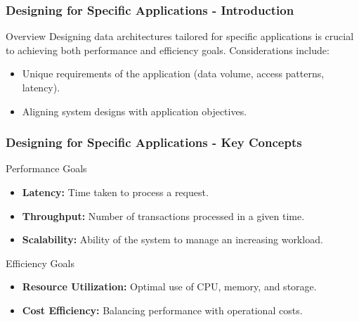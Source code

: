 \documentclass[aspectratio=169]{beamer}
\begin{document}
\begin{frame}[fragile]
    \frametitle{Designing for Specific Applications - Introduction}
    \begin{block}{Overview}
        Designing data architectures tailored for specific applications is crucial to achieving both performance and efficiency goals. Considerations include:
    \end{block}
    \begin{itemize}
        \item Unique requirements of the application (data volume, access patterns, latency).
        \item Aligning system designs with application objectives.
    \end{itemize}
\end{frame}

\begin{frame}[fragile]
    \frametitle{Designing for Specific Applications - Key Concepts}
    \begin{block}{Performance Goals}
        \begin{itemize}
            \item \textbf{Latency:} Time taken to process a request.
            \item \textbf{Throughput:} Number of transactions processed in a given time.
            \item \textbf{Scalability:} Ability of the system to manage an increasing workload.
        \end{itemize}
    \end{block}
    \begin{block}{Efficiency Goals}
        \begin{itemize}
            \item \textbf{Resource Utilization:} Optimal use of CPU, memory, and storage.
            \item \textbf{Cost Efficiency:} Balancing performance with operational costs.
        \end{itemize}
    \end{block}
\end{frame}
\end{document}
